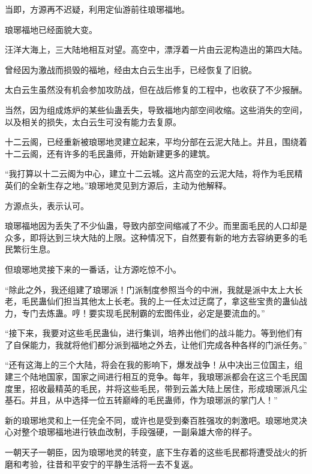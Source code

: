 
\begin{this_body}



当即，方源再不迟疑，利用定仙游前往琅琊福地。

琅琊福地已经面貌大变。

汪洋大海上，三大陆地相互对望。高空中，漂浮着一片由云泥构造出的第四大陆。

曾经因为激战而损毁的福地，经由太白云生出手，已经恢复了旧貌。

太白云生虽然没有机会参加攻防战，但在战后修复的工程中，也收获了不少报酬。

当然，因为组成炼炉的某些仙蛊丢失，导致福地内部空间收缩。这些消失的空间，以及相关的损失，太白云生可没有能力去复原。

十二云阁，已经重新被琅琊地灵建立起来，平均分部在云泥大陆上。并且，围绕着十二云阁，还有许多的毛民蛊师，开始新建更多的建筑。

“我打算以十二云阁为中心，建立十二云城。这片高空的云泥大陆，将作为毛民精英们的全新生存之地。”琅琊地灵见到方源后，主动为他解释。

方源点头，表示认可。

琅琊福地因为丢失了不少仙蛊，导致内部空间缩减了不少。而里面毛民的人口却是众多，即将达到三块大陆的上限。这种情况下，自然要有新的地方去容纳更多的毛民繁衍生息。

但琅琊地灵接下来的一番话，让方源吃惊不小。

“除此之外，我还组建了琅琊派！门派制度参照当今的中洲，我就是派中太上大长老，毛民蛊仙们担当其他太上长老。我的上一任太过迂腐了，拿这些宝贵的蛊仙战力，专门去炼蛊。哼！要实现毛民制霸的宏图伟业，必定是要流血的。”

“接下来，我要对这些毛民蛊仙，进行集训，培养出他们的战斗能力。等到他们有了自保能力，我就将他们都分派到福地之外去，让他们完成各种各样的门派任务。”

“还有这海上的三个大陆，将会在我的影响下，爆发战争！从中决出三位国主，组建三个陆地国家，国家之间进行相互的竞争。每年，我琅琊派都会在这三个毛民国度里，招收最精英的毛民，并将这些毛民，带到云盖大陆上居住，形成琅琊派凡尘基石。并且，从中选择一位五转巅峰的毛民蛊师，作为琅琊派的掌门人！”

新的琅琊地灵和上一任完全不同，或许也是受到秦百胜强攻的刺激吧。琅琊地灵决心对整个琅琊福地进行铁血改制，手段强硬，一副枭雄大帝的样子。

一朝天子一朝臣，因为琅琊地灵的转变，底下生存着的这些毛民都将遭受战火的折磨和考验，往昔和平安宁的平静生活将一去不复返。


\end{this_body}
